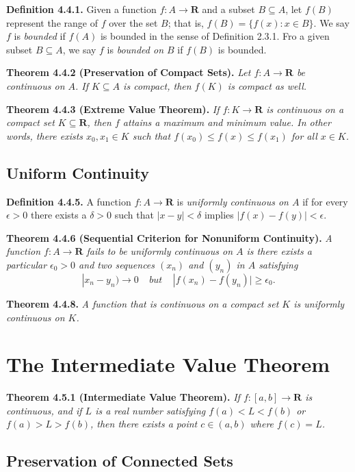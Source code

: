 \documentclass[12pt]{report}
\newcommand{\R}{\textbf{R}}
\begin{document}
\noindent \textbf{Definition 4.4.1.} Given a function $f:A\rightarrow\R$ and a subset $B\subseteq A$, let $f(B)$ represent the range of $f$ over the set $B$; that is, $f(B)=\{f(x):x\in B\}$.  We say $f$ is \textit{bounded} if $f(A)$ is bounded in the sense of Definition 2.3.1.  Fro a given subset $B\subseteq A$, we say $f$ is \textit{bounded on $B$} if $f(B)$ is bounded.
\bigskip

\noindent \textbf{Theorem 4.4.2 (Preservation of Compact Sets).} \textit{Let $f:A\rightarrow\R$ be continuous on $A$.  If $K\subseteq A$ is compact, then $f(K)$ is compact as well.}
\bigskip

\noindent \textbf{Theorem 4.4.3 (Extreme Value Theorem).} \textit{If $f:K\rightarrow\R$ is continuous on a compact set $K\subseteq\R$, then $f$ attains a maximum and minimum value.  In other words, there exists $x_0,x_1\in K$ such that $f(x_0)\leq f(x)\leq f(x_1)$ for all $x\in K$.}
\bigskip

\subsection*{Uniform Continuity}

\noindent \textbf{Definition 4.4.5.} A function $f:A\rightarrow\R$ is \textit{uniformly continuous on $A$} if for every $\epsilon>0$ there exists a $\delta>0$ such that $|x-y|<\delta$ implies $|f(x)-f(y)|<\epsilon$.
\bigskip

\noindent \textbf{Theorem 4.4.6 (Sequential Criterion for Nonuniform Continuity).} \textit{A function $f:A\rightarrow\R$ fails to be uniformly continuous on $A$ is there exists a particular $\epsilon_0>0$ and two sequences $(x_n)$ and $(y_n)$ in $A$ satisfying}
\[|x_n-y_n)\rightarrow 0\ \ \ \ \ but\ \ \ \ \ |f(x_n)-f(y_n)|\geq\epsilon_0.\]
\bigskip

\noindent \textbf{Theorem 4.4.8.} \textit{A function that is continuous on a compact set $K$ is uniformly continuous on $K$.}
\bigskip

\section{The Intermediate Value Theorem}

\noindent \textbf{Theorem 4.5.1 (Intermediate Value Theorem).} \textit{If $f:[a,b]\rightarrow\R$ is continuous, and if $L$ is a real number satisfying $f(a)<L<f(b)$ or $f(a)>L>f(b)$, then there exists a point $c\in(a,b)$ where $f(c)=L$.}
\bigskip

\subsection*{Preservation of Connected Sets}
\end{document}
